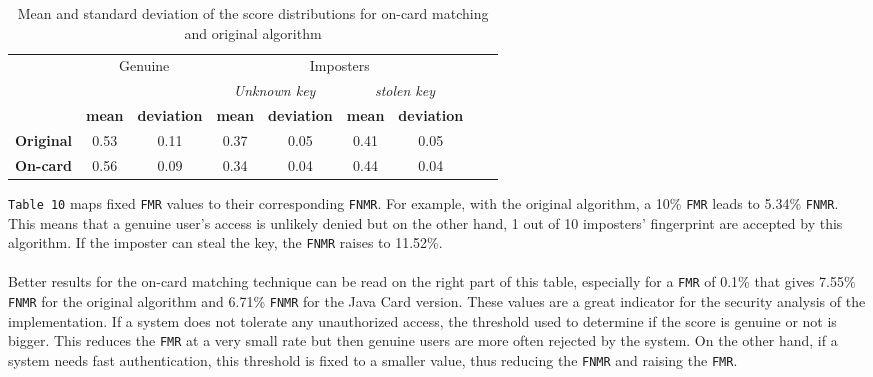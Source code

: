 \documentclass[a4paper,12pt]{article}
\begin{document}
\begin{table}[htbp]
  \centering
    \begin{tabular}{ccccccccc}
    \toprule
          & \multicolumn{2}{c}{\multirow{2}[0]{*}{Genuine}} & \multicolumn{4}{c}{Imposters} \\
    
          & \multicolumn{2}{c}{} & \multicolumn{2}{c}{\textit{Unknown key}} & \multicolumn{2}{c}{\textit{stolen key}} \\
          \midrule
          & \textbf{mean} & \textbf{deviation} & \textbf{mean} & \textbf{deviation} & \textbf{mean} & \textbf{deviation} \\
    \textbf{Original} & 0.53  & 0.11  & 0.37  & 0.05  & 0.41  & 0.05 \\
    \textbf{On-card} & 0.56  & 0.09  & 0.34  & 0.04  & 0.44  & 0.04 \\
    \bottomrule
    \end{tabular}%
  
  \caption{Mean and standard deviation of the score distributions for on-card matching and original algorithm}
  \label{tab:deviation}%
\end{table}%
\FloatBarrier

\texttt{Table 10} maps fixed \texttt{FMR} values to their corresponding \texttt{FNMR}. For example, with the original algorithm, a 10\% \texttt{FMR} leads to 5.34\% \texttt{FNMR}. This means that a genuine user's access is unlikely denied but on the other hand, 1 out of 10 imposters' fingerprint are accepted by this algorithm. If the imposter can steal the key, the \texttt{FNMR} raises to 11.52\%.\\\\
Better results for the on-card matching technique can be read on the right part of this table, especially for a \texttt{FMR} of 0.1\% that gives 7.55\% \texttt{FNMR} for the original algorithm and 6.71\% \texttt{FNMR} for the Java Card version. These values are a great indicator for the security analysis of the implementation. If a system does not tolerate any unauthorized access, the threshold used to determine if the score is genuine or not is bigger. This reduces the \texttt{FMR} at a very small rate but then genuine users are more often rejected by the system. On the other hand, if a system needs fast authentication, this threshold is fixed to a smaller value, thus reducing the \texttt{FNMR} and raising the \texttt{FMR}.
\end{document}
